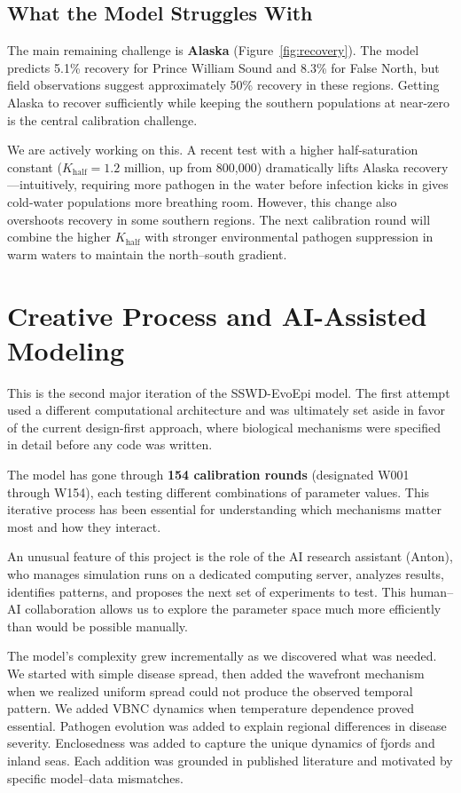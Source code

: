 \documentclass[11pt]{article}
\begin{document}
\subsection*{What the Model Struggles With}

The main remaining challenge is \textbf{Alaska} (Figure~\ref{fig:recovery}). The model predicts 5.1\% recovery for Prince William Sound and 8.3\% for False North, but field observations suggest approximately 50\% recovery in these regions. Getting Alaska to recover sufficiently while keeping the southern populations at near-zero is the central calibration challenge.

We are actively working on this. A recent test with a higher half-saturation constant ($K_{\text{half}} = 1.2$ million, up from 800,000) dramatically lifts Alaska recovery---intuitively, requiring more pathogen in the water before infection kicks in gives cold-water populations more breathing room. However, this change also overshoots recovery in some southern regions. The next calibration round will combine the higher $K_{\text{half}}$ with stronger environmental pathogen suppression in warm waters to maintain the north--south gradient.

\section{Creative Process and AI-Assisted Modeling}

This is the second major iteration of the SSWD-EvoEpi model. The first attempt used a different computational architecture and was ultimately set aside in favor of the current design-first approach, where biological mechanisms were specified in detail before any code was written.

The model has gone through \textbf{154 calibration rounds} (designated W001 through W154), each testing different combinations of parameter values. This iterative process has been essential for understanding which mechanisms matter most and how they interact.

An unusual feature of this project is the role of the AI research assistant (Anton), who manages simulation runs on a dedicated computing server, analyzes results, identifies patterns, and proposes the next set of experiments to test. This human--AI collaboration allows us to explore the parameter space much more efficiently than would be possible manually.

The model's complexity grew incrementally as we discovered what was needed. We started with simple disease spread, then added the wavefront mechanism when we realized uniform spread could not produce the observed temporal pattern. We added VBNC dynamics when temperature dependence proved essential. Pathogen evolution was added to explain regional differences in disease severity. Enclosedness was added to capture the unique dynamics of fjords and inland seas. Each addition was grounded in published literature and motivated by specific model--data mismatches.
\end{document}
